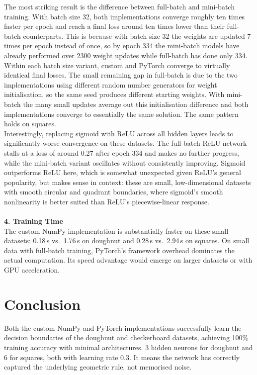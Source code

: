 \documentclass[fleqn,moreauthors,10pt]{ds_report}
\begin{document}
The most striking result is the difference between full-batch and mini-batch
training. With batch size 32, both implementations converge roughly ten times
faster per epoch and reach a final loss around ten times lower than their
full-batch counterparts. This is because with batch size 32 the weights are updated
7 times per epoch instead of once, so by epoch 334 the mini-batch models
have already performed over 2300 weight updates while full-batch has done only 334.
\\
Within each batch size variant, custom and PyTorch converge to virtually
identical final losses. The small remaining gap in full-batch is due to
the two implementations using different random number generators for weight
initialisation, so the same seed
produces different starting weights. With mini-batch the many small updates
average out this initialisation difference and both implementations converge
to essentially the same solution. The same pattern holds on squares.
\\
Interestingly, replacing sigmoid with ReLU across all hidden layers leads to
significantly worse convergence on these datasets. The full-batch ReLU network
stalls at a loss of around 0.27 after epoch 334 and makes no further progress,
while the mini-batch variant oscillates without consistently improving. Sigmoid
outperforms ReLU here, which is somewhat unexpected given ReLU's general popularity,
but makes sense in context: these are small, low-dimensional datasets with smooth
circular and quadrant boundaries, where sigmoid's smooth nonlinearity is better
suited than ReLU's piecewise-linear response.
\vspace{0.3cm}
\\
\\
\textbf{4. Training Time}\\
The custom NumPy implementation is substantially faster on these small datasets:
0.18\,s vs.\ 1.76\,s on doughnut and 0.28\,s vs.\ 2.94\,s on squares. On small
data with full-batch training, PyTorch's framework overhead dominates the actual
computation. Its speed advantage would emerge on larger datasets or with GPU
acceleration.



\section*{Conclusion}

Both the custom NumPy and PyTorch implementations successfully learn the decision
boundaries of the doughnut and checkerboard datasets, achieving 100\% training
accuracy with minimal architectures. 3 hidden neurons for doughnut and 6 for
squares, both with learning rate 0.3. It means the network has correctly
captured the underlying geometric rule, not memorised noise.
\end{document}
